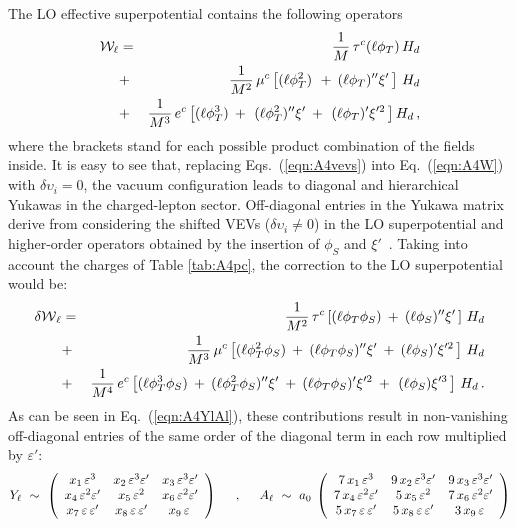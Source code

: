 \documentclass[a4paper,11pt]{article}
\newcommand{\bea}{\begin{eqnarray}}
\newcommand{\beq}{\begin{equation}}
\newcommand{\eea}{\end{eqnarray}}
\newcommand{\eeq}{\end{equation}}
\newcommand{\vep}{\varepsilon}
\newcommand{\nn}{\nonumber}
\newcommand{\eq}[1]{Eq.~(\ref{#1})}
\begin{document}
The LO effective superpotential contains the following operators
\bea
\label{eqn:A4W} 
  {\cal W}_\ell & = & \frac{1}{M}\, \tau^c(\ell \phi_T )\, H_d \nn\\
             		& + & \frac{1}{M^2}\, \mu^c\left[(\ell \phi_T^2)\, \:+\: (\ell \phi_T)''\xi'\, \right]\,H_{d}  \\
             		& + &  \frac{1}{M^3}\, e^c\left[ (\ell \phi_T^3) \nn \:+\:\, (\ell \phi_T^2)''\xi'\:+\:\, (\ell \phi_T)'\xi'^2\, \right] H_d \, ,\nn       
\eea
where the brackets stand for each possible product combination of the fields inside. It is easy to see that, replacing Eqs.~(\ref{eqn:A4vevs}) into \eq{eqn:A4W} with {\small $\delta \upsilon_{i}=0$}, the vacuum configuration leads to diagonal and hierarchical Yukawas in the charged-lepton sector. Off-diagonal entries in the Yukawa matrix derive from considering the shifted VEVs ({\small $\delta\upsilon_i\neq 0$}) in the LO superpotential and higher-order operators obtained by the insertion of $\phi_S$ and $\xi'$~\cite{Altarelli:2009kr}. Taking into account the charges of Table \ref{tab:A4pc}, the correction to the LO superpotential would be:
\bea
\label{eqn:A4dW}
 {\cal \delta W}_\ell & = &  \frac{1}{M^2}\, \tau^c\left[(\ell \phi_T \phi_S)\:+\: (\ell \phi_S)''{\xi'}\, \right]\,H_{d}\nn\\
             			& + & \frac{1}{M^3}\, \mu^c\left[(\ell \phi_T^2 \phi_S)\:+\:(\ell \phi_T \phi_S)''\xi' \:+\: (\ell\phi_S)'\xi'^2 \,\right]\,H_{d} \\       
				& + &  \frac{1}{M^4}\, e^c\left[(\ell \phi_T^3 \phi_S)\nn \:+\: (\ell \phi_T^2\phi_S)''\xi'\:+\:(\ell \phi_T\phi_S)'\xi'^2 \:+\:\,(\ell \phi_S)\xi'^3 \,\right]\, H_d\,. \nn         
\eea 
As can be seen in \eq{eqn:A4YlAl}, these contributions result in non-vanishing off-diagonal entries of the same order of the diagonal term in each row multiplied by $\vep'$:
\beq 
\label{eqn:A4YlAl}
 Y_\ell ~ \sim ~ \left(\begin{array}{ccc}
               x_1\,\vep^3      &  x_2\,\vep^3\vep' & x_3\,\vep^3\vep' \\
               x_4\,\vep^2\vep' &  x_5\,\vep^2      & x_6\,\vep^2\vep' \\
               x_7\,\vep\,\vep' &  x_8\,\vep\,\vep' & x_9\,\vep\,   
               \end{array} \right)
 \hspace{0.5cm} , \hspace{0.5cm}
 A_\ell ~ \sim ~  a_{0}\: \left(\begin{array}{ccc}
               7\,x_1\,\vep^3      &  9\,x_2\,\vep^3\vep' & 9\,x_3\,\vep^3\vep' \\
               7\,x_4\,\vep^2\vep' &  5\,x_5\,\vep^2      & 7\,x_6\,\vep^2\vep' \\
               5\,x_7\,\vep\,\vep' &  5\,x_8\,\vep\,\vep' & 3\,x_9\,\vep\,   
               \end{array} \right)         
\eeq
\end{document}

